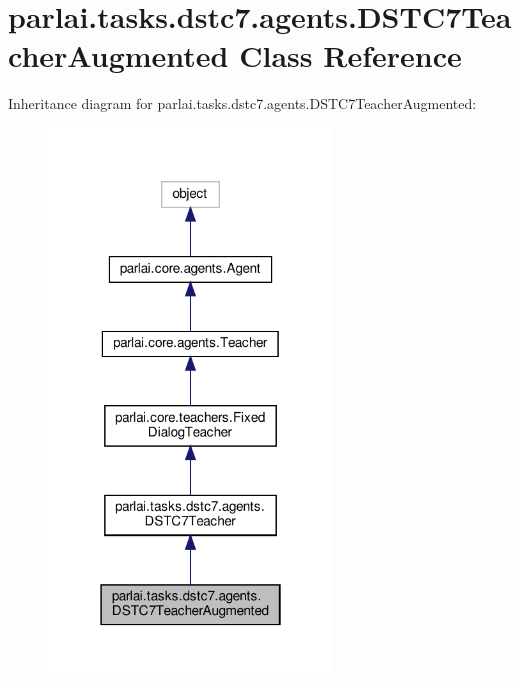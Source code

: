 \hypertarget{classparlai_1_1tasks_1_1dstc7_1_1agents_1_1DSTC7TeacherAugmented}{}\section{parlai.\+tasks.\+dstc7.\+agents.\+D\+S\+T\+C7\+Teacher\+Augmented Class Reference}
\label{classparlai_1_1tasks_1_1dstc7_1_1agents_1_1DSTC7TeacherAugmented}


Inheritance diagram for parlai.\+tasks.\+dstc7.\+agents.\+D\+S\+T\+C7\+Teacher\+Augmented\+:
\nopagebreak
\begin{figure}[H]
\begin{center}
\leavevmode
\includegraphics[width=214pt]{dd/d6d/classparlai_1_1tasks_1_1dstc7_1_1agents_1_1DSTC7TeacherAugmented__inherit__graph}
\end{center}
\end{figure}


